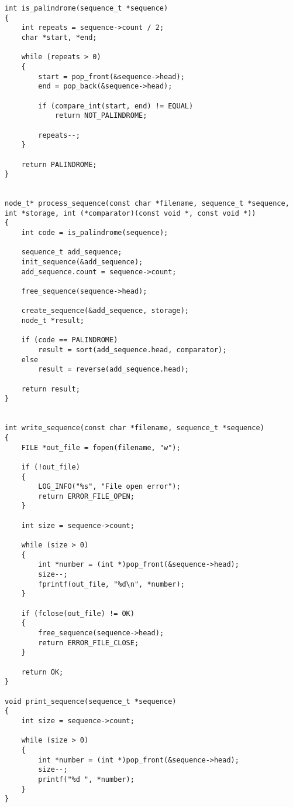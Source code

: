 \begin{center}
\begin{lstlisting}[label=lst:sequence,caption=sequence.c]
int is_palindrome(sequence_t *sequence)
{
    int repeats = sequence->count / 2;
    char *start, *end;

    while (repeats > 0)
    {
        start = pop_front(&sequence->head);
        end = pop_back(&sequence->head);

        if (compare_int(start, end) != EQUAL)
            return NOT_PALINDROME;

        repeats--;
    }

    return PALINDROME;
}


node_t* process_sequence(const char *filename, sequence_t *sequence,
int *storage, int (*comparator)(const void *, const void *))
{
    int code = is_palindrome(sequence);

    sequence_t add_sequence;
    init_sequence(&add_sequence);
    add_sequence.count = sequence->count;

    free_sequence(sequence->head);

    create_sequence(&add_sequence, storage);
    node_t *result;

    if (code == PALINDROME)
        result = sort(add_sequence.head, comparator);
    else
        result = reverse(add_sequence.head);

    return result;
}


int write_sequence(const char *filename, sequence_t *sequence)
{
    FILE *out_file = fopen(filename, "w");

    if (!out_file)
    {
        LOG_INFO("%s", "File open error");
        return ERROR_FILE_OPEN;
    }

    int size = sequence->count;

    while (size > 0)
    {
        int *number = (int *)pop_front(&sequence->head);
        size--;
        fprintf(out_file, "%d\n", *number);
    }

    if (fclose(out_file) != OK)
    {
        free_sequence(sequence->head);
        return ERROR_FILE_CLOSE;
    }

    return OK;
}

void print_sequence(sequence_t *sequence)
{
    int size = sequence->count;

    while (size > 0)
    {
        int *number = (int *)pop_front(&sequence->head);
        size--;
        printf("%d ", *number);
    }
}
\end{lstlisting}
\end{center}

\clearpage

